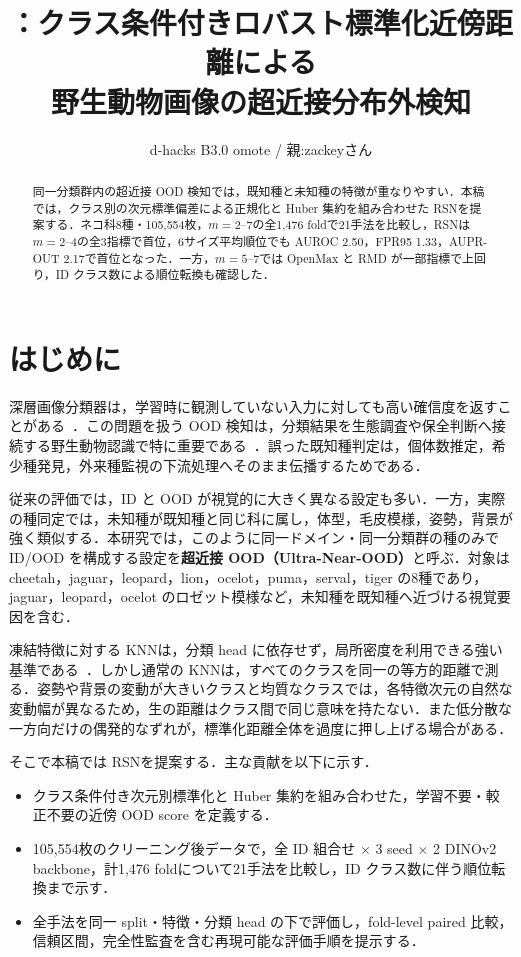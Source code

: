 \documentclass[uplatex,dvipdfmx,a4paper,10pt,twocolumn]{bxjsarticle}
\title{\bfseries \RSN：クラス条件付きロバスト標準化近傍距離による\\
野生動物画像の超近接分布外検知}
\author{d-hacks B3.0 omote \quad / \quad 親:zackeyさん}
\date{}
\newcommand{\RSN}{RSN}
\newcommand{\knn}{KNN}
\begin{document}
\maketitle

\begin{abstract}
同一分類群内の超近接 OOD 検知では，既知種と未知種の特徴が重なりやすい．本稿では，クラス別の次元標準偏差による正規化と Huber 集約を組み合わせた \RSN を提案する．ネコ科8種・105,554枚，$m=2$--7の全1,476 foldで21手法を比較し，\RSN は $m=2$--4の全3指標で首位，6サイズ平均順位でも AUROC 2.50，FPR95 1.33，AUPR-OUT 2.17で首位となった．一方，$m=5$--7では OpenMax と RMD が一部指標で上回り，ID クラス数による順位転換も確認した．
\end{abstract}

\section{はじめに}

深層画像分類器は，学習時に観測していない入力に対しても高い確信度を返すことがある~\cite{hendrycks2017baseline}．この問題を扱う OOD 検知は，分類結果を生態調査や保全判断へ接続する野生動物認識で特に重要である~\cite{norouzzadeh2018automatically,tuia2022perspectives}．誤った既知種判定は，個体数推定，希少種発見，外来種監視の下流処理へそのまま伝播するためである．

従来の評価では，ID と OOD が視覚的に大きく異なる設定も多い．一方，実際の種同定では，未知種が既知種と同じ科に属し，体型，毛皮模様，姿勢，背景が強く類似する．本研究では，このように同一ドメイン・同一分類群の種のみで ID/OOD を構成する設定を\textbf{超近接 OOD（Ultra-Near-OOD）}と呼ぶ．対象は cheetah，jaguar，leopard，lion，ocelot，puma，serval，tiger の8種であり，jaguar，leopard，ocelot のロゼット模様など，未知種を既知種へ近づける視覚要因を含む．

凍結特徴に対する \knn は，分類 head に依存せず，局所密度を利用できる強い基準である~\cite{sun2022knn}．しかし通常の \knn は，すべてのクラスを同一の等方的距離で測る．姿勢や背景の変動が大きいクラスと均質なクラスでは，各特徴次元の自然な変動幅が異なるため，生の距離はクラス間で同じ意味を持たない．また低分散な一方向だけの偶発的なずれが，標準化距離全体を過度に押し上げる場合がある．

\newpage
そこで本稿では \RSN を提案する．主な貢献を以下に示す．
\begin{itemize}
  \item クラス条件付き次元別標準化と Huber 集約を組み合わせた，学習不要・較正不要の近傍 OOD score を定義する．
  \item 105,554枚のクリーニング後データで，全 ID 組合せ $\times$ 3 seed $\times$ 2 DINOv2 backbone，計1,476 foldについて21手法を比較し，ID クラス数に伴う順位転換まで示す．
  \item 全手法を同一 split・特徴・分類 head の下で評価し，fold-level paired 比較，信頼区間，完全性監査を含む再現可能な評価手順を提示する．
\end{itemize}
\end{document}

